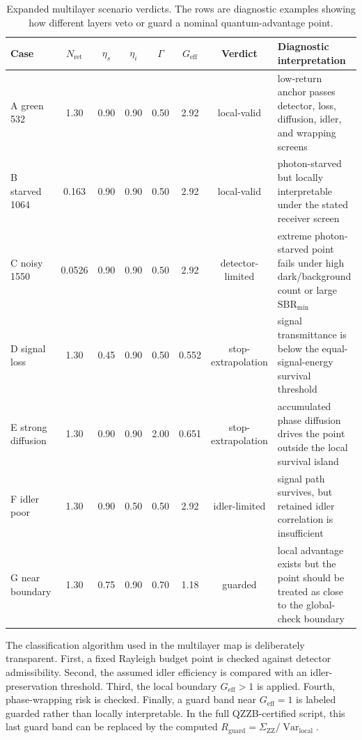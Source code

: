 \documentclass[a4paper,11pt]{article}
\numberwithin{equation}{section}
\newcommand{\Nret}{N_{\mathrm{ret}}}
\newcommand{\Geff}{G_{\mathrm{eff}}}
\newcommand{\Var}{\operatorname{Var}}
\newcommand{\Rguard}{R_{\mathrm{guard}}}
\newcommand{\SBR}{\mathrm{SBR}}
\begin{document}
\begin{table}[htbp]
\centering
\caption{Expanded multilayer scenario verdicts. The rows are diagnostic examples showing how different layers veto or guard a nominal quantum-advantage point.}
\label{tab:expanded_verdicts}
\scriptsize
\renewcommand{\arraystretch}{1.12}
\begin{tabularx}{\textwidth}{lccccccX}
\toprule
Case & $\Nret$ & $\eta_s$ & $\eta_i$ & $\Gamma$ & $\Geff$ & Verdict & Diagnostic interpretation \\
\midrule
A green 532 & 1.30 & 0.90 & 0.90 & 0.50 & 2.92 & local-valid & low-return anchor passes detector, loss, diffusion, idler, and wrapping screens \\
B starved 1064 & 0.163 & 0.90 & 0.90 & 0.50 & 2.92 & local-valid & photon-starved but locally interpretable under the stated receiver screen \\
C noisy 1550 & 0.0526 & 0.90 & 0.90 & 0.50 & 2.92 & detector-limited & extreme photon-starved point fails under high dark/background count or large $\SBR_{\min}$ \\
D signal loss & 1.30 & 0.45 & 0.90 & 0.50 & 0.552 & stop-extrapolation & signal transmittance is below the equal-signal-energy survival threshold \\
E strong diffusion & 1.30 & 0.90 & 0.90 & 2.00 & 0.651 & stop-extrapolation & accumulated phase diffusion drives the point outside the local survival island \\
F idler poor & 1.30 & 0.90 & 0.50 & 0.50 & 2.92 & idler-limited & signal path survives, but retained idler correlation is insufficient \\
G near boundary & 1.30 & 0.75 & 0.90 & 0.70 & 1.18 & guarded & local advantage exists but the point should be treated as close to the global-check boundary \\
\bottomrule
\end{tabularx}
\end{table}

The classification algorithm used in the multilayer map is deliberately transparent. First, a fixed Rayleigh budget point is checked against detector admissibility. Second, the assumed idler efficiency is compared with an idler-preservation threshold. Third, the local boundary $\Geff>1$ is applied. Fourth, phase-wrapping risk is checked. Finally, a guard band near $\Geff=1$ is labeled guarded rather than locally interpretable. In the full QZZB-certified script, this last guard band can be replaced by the computed $\Rguard=\Sigma_{\mathrm{ZZ}}/\Var_{\mathrm{local}}$.
\end{document}
